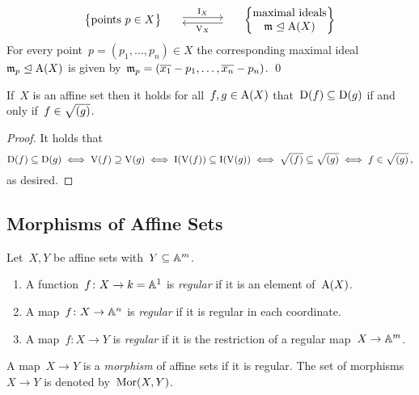 \begin{theorem}
\[\begin{matrix}
        {}
      & {}
      & {}
      \\
        \left\{
          \begin{tabular}{@{}c@{}}
            points~$p \in X$
          \end{tabular}
        \right\}
      & \begin{tikzcd}[column sep = large]
            {}
            \arrow[shift left]{r}{\videal_X}
          & {}
            \arrow[shift left]{l}{\vset_X}
        \end{tikzcd}
      & \left\{
          \begin{tabular}{@{}c@{}}
            maximal ideals \\
            $\mf{m} \idealleq \coord(X)$
          \end{tabular}
        \right\}
    \end{matrix}
  \]
  For every point~$p = (p_1, \dotsc, p_n) \in X$ the corresponding maximal ideal~$\mathfrak{m}_p \trianglelefteq \operatorname{A}(X)$ is given by~$\mathfrak{m}_p = (\overline{x_1} - p_1, \dotsc, \overline{x_n} - p_n)$.
  \qed
\end{theorem}


\begin{corollary}
  \label{containment of D}
  If~$X$ is an affine set then it holds for all~$f, g \in \operatorname{A}(X)$ that~$\operatorname{D}(f) \subseteq \operatorname{D}(g)$ if and only if~$f \in \sqrt{(g)}$.
\end{corollary}


\begin{proof}
  It holds that
  \[
          \operatorname{D}(f) \subseteq \operatorname{D}(g)
    \iff  \operatorname{V}(f) \supseteq \operatorname{V}(g)
    \iff  \operatorname{I}(\operatorname{V}(f)) \subseteq \operatorname{I}(\operatorname{V}(g))
    \iff  \sqrt{(f)} \subseteq \sqrt{(g)}
    \iff  f \in \sqrt{(g)} \,,
  \]
  as desired.
\end{proof}






\subsection{Morphisms of Affine Sets}


\begin{definition}
  \label{regular for affine}
  Let~$X,Y$ be affine sets with~$Y \subseteq \mathbb{A}^m$.
  \begin{enumerate}
    \item
      A function~$f \colon X \to k = \mathbb{A}^1$ is \emph{regular} if it is an element of~$\operatorname{A}(X)$.
    \item
      A map~$f \colon X \to \mathbb{A}^n$ is \emph{regular} if it is regular in each coordinate.
    \item
      A map~$f \colon X \to Y$ is \emph{regular} if it is the restriction of a regular map~$X \to \mathbb{A}^m$.
  \end{enumerate}
  A map~$X \to Y$ is a \emph{morphism} of affine sets if it is regular.
  The set of morphisms~$X \to Y$ is denoted by~$\operatorname{Mor}(X,Y)$.
\end{definition}


